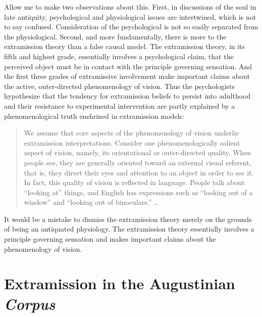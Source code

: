 \documentclass[12pt]{article}
\begin{document}
Allow me to make two observations about this. First, in discussions of the soul in late antiquity, psychological and physiological issues are intertwined, which is not to say confused. Consideration of the psychological is not so easily separated from the physiological. Second, and more fundamentally, there is more to the extramission theory than a false causal model. The extramission theory, in its fifth and highest grade, essentially involves a psychological claim, that the perceived object must be in contact with the principle governing sensation. And the first three grades of extramissive involvement make important claims about the active, outer-directed phenomenology of vision. Thus the psychologists \citet{Winer:1996as} hypothesize that the tendency for extramission beliefs to persist into adulthood and their resistance to experimental intervention are partly explained by a phenomenological truth enshrined in extramission models:
\begin{quote}
	We assume that core aspects of the phenomenology of vision underlie extramission interpretations. Consider one phenomenologically salient aspect of vision, namely, its orientational or outer-directed quality. When people see, they are generally oriented toward an external visual referent, that is, they direct their eyes and attention to an object in order to see it. In fact, this quality of vision is reflected in language. People talk about ``looking at'' things, and English has expressions such as ``looking out of a window'' and ``looking out of binoculars.'' \ldots\ \citep[140]{Winer:1996as}
\end{quote}
It would be a mistake to dismiss the extramission theory merely on the grounds of being an antiquated physiology. The extramission theory essentially involves a principle governing sensation and makes important claims about the phenomenology of vision.



\section{Extramission in the Augustinian \emph{Corpus}} %
\label{sec:extramission_in_the_augustinian_emph_corpus}
\end{document}
